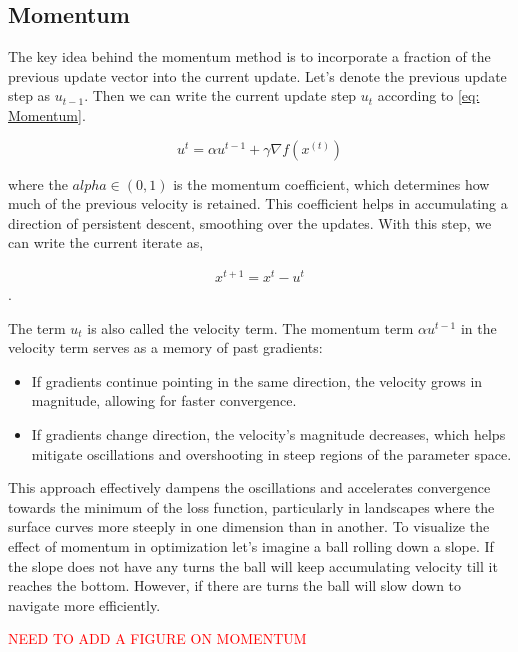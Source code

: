 

\subsection{Momentum}

 The key idea behind the momentum method is to incorporate a fraction of the previous update vector into the current update. Let's denote the previous update step as $u_{t-1}$. Then we can write the current update step $u_t$ according to \ref{eq: Momentum}.


 \begin{equation}
    \label{eq: Momentum}
    u^t = \alpha u^{t-1} + \gamma \nabla f(x^{(t)})   
 \end{equation}

\noindent where the $alpha \in (0,1)$ is the momentum coefficient, which determines how much of the previous velocity is retained. This coefficient helps in accumulating a direction of persistent descent, smoothing over the updates. With this step, we can write the current iterate as,

 \begin{align}
     x^{t+1} = x^{t} - u^{t}
 \end{align}.

The term $u_t$ is also called the velocity term. The momentum term $\alpha u^{t-1}$ in the velocity term serves as a memory of past gradients:

\begin{itemize}
    \item If gradients continue pointing in the same direction, the velocity grows in magnitude, allowing for faster convergence.
    \item If gradients change direction, the velocity's magnitude decreases, which helps mitigate oscillations and overshooting in steep regions of the parameter space.
\end{itemize}


\noindent This approach effectively dampens the oscillations and accelerates convergence towards the minimum of the loss function, particularly in landscapes where the surface curves more steeply in one dimension than in another. To visualize the effect of momentum in optimization let's imagine a ball rolling down a slope. If the slope does not have any turns the ball will keep accumulating velocity till it reaches the bottom. However, if there are turns the ball will slow down to navigate more efficiently. 


\textcolor{red}{NEED TO ADD A FIGURE ON MOMENTUM}


